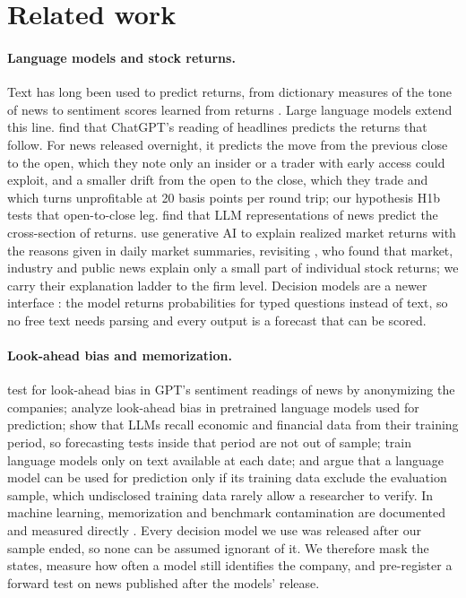 \section{Related work}\label{sec:related}

\paragraph{Language models and stock returns.} Text has long been used to predict returns, from dictionary
measures of the tone of news \citep{tetlock2007,tetlock2008} to sentiment scores learned from returns
\citep{ke2019}. Large language models extend this line. \citet{lopezlira2026} find that ChatGPT's reading of
headlines predicts the returns that follow. For news released overnight, it predicts the move from the previous
close to the open, which they note only an insider or a trader with early access could exploit, and a smaller
drift from the open to the close, which they trade and which turns unprofitable at 20 basis points per round trip;
our hypothesis H1b tests that open-to-close leg. \citet{chen2022} find that LLM representations of news predict the
cross-section of returns. \citet{kelly2026} use generative AI to explain realized market returns with the
reasons given in daily market summaries, revisiting \citet{roll1988}, who found that market, industry and
public news explain only a small part of individual stock returns; we carry their explanation ladder to the
firm level. Decision models are a newer interface
\citep{zhu2026}: the model returns probabilities for typed questions instead of text, so no free
text needs parsing and every output is a forecast that can be scored.

\paragraph{Look-ahead bias and memorization.} \citet{glasserman2024} test for look-ahead bias in GPT's
sentiment readings of news by anonymizing the companies; \citet{sarkar2024} analyze look-ahead bias in
pretrained language models used for prediction; \citet{lopezlira2025} show that LLMs recall economic and
financial data from their training period, so forecasting tests inside that period are not out of sample;
\citet{he2026} train language models only on text available at each date; and \citet{ludwig2026} argue that a
language model can be used for prediction only if its training data exclude the evaluation sample, which
undisclosed training data rarely allow a researcher to verify. In machine learning, memorization
and benchmark contamination are documented and measured directly \citep{carlini2023,golchin2024,sainz2023}. Every
decision model we use was released after our sample ended, so none can be assumed ignorant of it. We therefore
mask the states, measure how often a model still identifies the company, and pre-register a forward test on
news published after the models' release.

